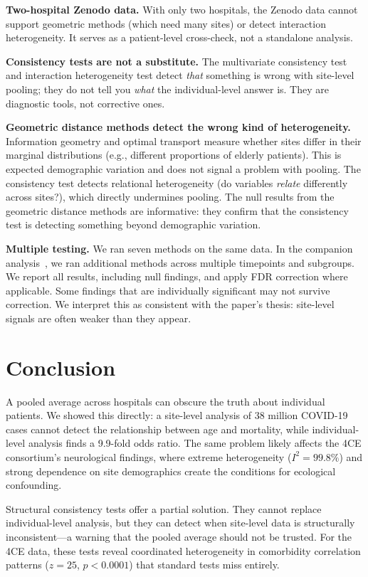 \documentclass{article}
\begin{document}
\textbf{Two-hospital Zenodo data.}  With only two hospitals, the Zenodo data
cannot support geometric methods (which need many sites) or detect interaction
heterogeneity.  It serves as a patient-level cross-check, not a standalone
analysis.

\textbf{Consistency tests are not a substitute.}  The multivariate consistency
test and interaction heterogeneity test detect \emph{that} something is wrong
with site-level pooling; they do not tell you \emph{what} the
individual-level answer is.  They are diagnostic tools, not corrective ones.

\textbf{Geometric distance methods detect the wrong kind of heterogeneity.}
Information geometry and optimal transport measure whether sites differ in
their marginal distributions (e.g., different proportions of elderly patients).
This is expected demographic variation and does not signal a problem with
pooling.  The consistency test detects relational heterogeneity (do variables
\emph{relate} differently across sites?), which directly undermines pooling.
The null results from the geometric distance methods are informative: they
confirm that the consistency test is detecting something beyond demographic
variation.

\textbf{Multiple testing.}  We ran seven methods on the same data.  In the
companion analysis~\cite{tower2025sitelevel}, we ran additional methods across multiple timepoints
and subgroups.  We report all results, including null findings, and apply
FDR correction where applicable.  Some findings that are individually
significant may not survive correction.  We interpret this as consistent with
the paper's thesis: site-level signals are often weaker than they appear.


\section{Conclusion}

A pooled average across hospitals can obscure the truth about individual
patients.  We showed this directly: a site-level analysis of 38 million
COVID-19 cases cannot detect the relationship between age and mortality, while
individual-level analysis finds a 9.9-fold odds ratio.  The same problem
likely affects the 4CE consortium's neurological findings, where extreme
heterogeneity ($I^2 = 99.8\%$) and strong dependence on site demographics
create the conditions for ecological confounding.

Structural consistency tests offer a partial solution.  They cannot replace
individual-level analysis, but they can detect when site-level data is
structurally inconsistent---a warning that the pooled average should not be
trusted.  For the 4CE data, these tests reveal coordinated heterogeneity
in comorbidity correlation patterns ($z = 25$, $p < 0.0001$) that standard
tests miss entirely.
\end{document}

